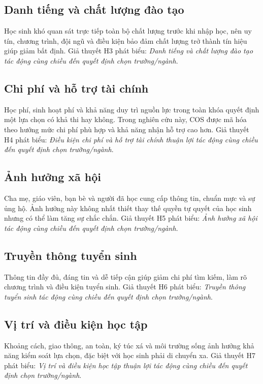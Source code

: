\subsection{Danh tiếng và chất lượng đào tạo}
Học sinh khó quan sát trực tiếp toàn bộ chất lượng trước khi nhập học, nên uy tín, chương trình, đội ngũ và điều kiện bảo đảm chất lượng trở thành tín hiệu giúp giảm bất định. Giả thuyết H3 phát biểu: \textit{Danh tiếng và chất lượng đào tạo tác động cùng chiều đến quyết định chọn trường/ngành}.

\subsection{Chi phí và hỗ trợ tài chính}
Học phí, sinh hoạt phí và khả năng duy trì nguồn lực trong toàn khóa quyết định một lựa chọn có khả thi hay không. Trong nghiên cứu này, COS được mã hóa theo hướng mức chi phí phù hợp và khả năng nhận hỗ trợ cao hơn. Giả thuyết H4 phát biểu: \textit{Điều kiện chi phí và hỗ trợ tài chính thuận lợi tác động cùng chiều đến quyết định chọn trường/ngành}.

\subsection{Ảnh hưởng xã hội}
Cha mẹ, giáo viên, bạn bè và người đã học cung cấp thông tin, chuẩn mực và sự ủng hộ. Ảnh hưởng này không nhất thiết thay thế quyền tự quyết của học sinh nhưng có thể làm tăng sự chắc chắn. Giả thuyết H5 phát biểu: \textit{Ảnh hưởng xã hội tác động cùng chiều đến quyết định chọn trường/ngành}.

\subsection{Truyền thông tuyển sinh}
Thông tin đầy đủ, đáng tin và dễ tiếp cận giúp giảm chi phí tìm kiếm, làm rõ chương trình và điều kiện tuyển sinh. Giả thuyết H6 phát biểu: \textit{Truyền thông tuyển sinh tác động cùng chiều đến quyết định chọn trường/ngành}.

\subsection{Vị trí và điều kiện học tập}
Khoảng cách, giao thông, an toàn, ký túc xá và môi trường sống ảnh hưởng khả năng kiểm soát lựa chọn, đặc biệt với học sinh phải di chuyển xa. Giả thuyết H7 phát biểu: \textit{Vị trí và điều kiện học tập thuận lợi tác động cùng chiều đến quyết định chọn trường/ngành}.

